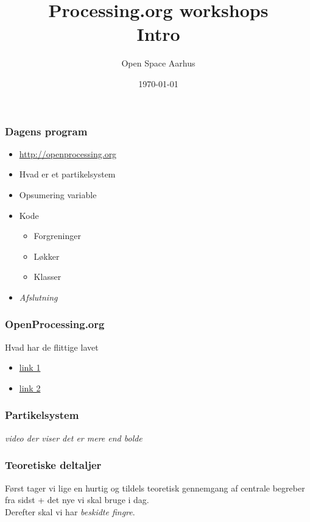 \documentclass{beamer}
\title{Processing.org workshops\\Intro}
\author{Open Space Aarhus}
\date{\today}
\institute[Bryggervej 30]{Bryggervej 30, 8240 Århus N}
\begin{document}
\begin{frame}[label=titlepage]
  \titlepage
\end{frame}

\begin{frame}
  \frametitle{Dagens program}
  \begin{itemize}
  \item \url{http://openprocessing.org}
  \item Hvad er et partikelsystem
  \item Opsumering variable
  \item Kode
    \begin{itemize}
    \item Forgreninger
    \item Løkker
    \item Klasser
    \end{itemize}

  \item \emph{Afslutning}
    
  \end{itemize}						
\end{frame}


\begin{frame}
  \frametitle{OpenProcessing.org}
  \begin{block}{Hvad har de flittige lavet}
    \begin{itemize}
    \item \url{link 1}
    \item \url{link 2}
    \end{itemize}
  \end{block}
\end{frame}



\begin{frame}
  \frametitle{Partikelsystem}
  
  \emph{video der viser det er mere end bolde}

\end{frame}


\begin{frame}
  \frametitle{Teoretiske deltaljer}
  
  Først tager vi lige en hurtig og tildels teoretisk gennemgang af
  centrale begreber fra sidst + det nye vi skal bruge i dag. \\
\vspace{2cm}
  Derefter skal vi har \emph{beskidte fingre}.
\end{frame}
\end{document}
